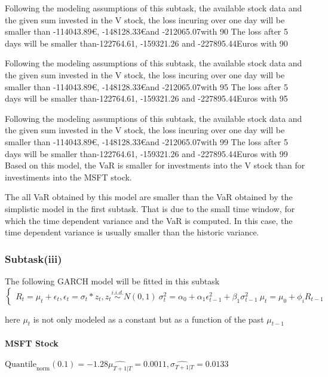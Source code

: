 Following the modeling assumptions of this subtask, the available stock data and the given sum invested in the V stock, the loss incuring over one day will be smaller than -114043.89\euro, -148128.33\euro and -212065.07\euroEuros with 90%
The loss after 5 days will be smaller than-122764.61, -159321.26 and -227895.44Euros with 90%


Following the modeling assumptions of this subtask, the available stock data and the given sum invested in the V stock, the loss incuring over one day will be smaller than -114043.89\euro, -148128.33\euro and -212065.07\euroEuros with 95%
The loss after 5 days will be smaller than-122764.61, -159321.26 and -227895.44Euros with 95%


Following the modeling assumptions of this subtask, the available stock data and the given sum invested in the V stock, the loss incuring over one day will be smaller than -114043.89\euro, -148128.33\euro and -212065.07\euroEuros with 99%
The loss after 5 days will be smaller than-122764.61, -159321.26 and -227895.44Euros with 99%
Based on this model, the VaR is smaller for investments into the V stock than for investiments into the MSFT stock.

The all VaR obtained by this model are smaller than the VaR obtained by the simplistic model in the first subtask. That is due to the small time window, for which the time dependent variance and the VaR is computed. In this case, the time dependent variance is usually smaller than the historic variance.

\subsubsection{Subtask(iii)}
The following GARCH model will be fitted in this subtask
$\begin{cases} R_t = \mu_t + \epsilon_t, \epsilon_t = \sigma_t  * z_t, z_t \overset{i.i.d.}{\sim} N(0,1) \ \sigma^2_t = \alpha_0 + \alpha_1 \epsilon^2_{t-1} + \beta_1 \sigma^2_{t-1} \ \mu_t = \mu_0 + \phi_i R_{t-1} \end{cases}$ 


here $\mu_t$ is not only modeled as a constant but as a function of the past $\mu_{t-1}$
\paragraph{MSFT Stock}


$\text{Quantile}_\text{norm}(0.1) = -1.28$$\hat{\mu_{T+1|T}} = 0.0011, \hat{\sigma_{T+1|T}} = 0.0133$

